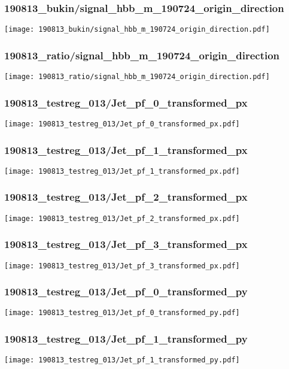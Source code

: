 \begin{frame}
   \frametitle{\small 190813\_bukin/signal\_hbb\_m\_190724\_origin\_direction}
   \centering
   \texttt{[image: 190813\_bukin/signal\_hbb\_m\_190724\_origin\_direction.pdf]}
\end{frame}

\begin{frame}
   \frametitle{\small 190813\_ratio/signal\_hbb\_m\_190724\_origin\_direction}
   \centering
   \texttt{[image: 190813\_ratio/signal\_hbb\_m\_190724\_origin\_direction.pdf]}
\end{frame}

\begin{frame}
   \frametitle{\small 190813\_testreg\_013/Jet\_pf\_0\_transformed\_px}
   \centering
   \texttt{[image: 190813\_testreg\_013/Jet\_pf\_0\_transformed\_px.pdf]}
\end{frame}

\begin{frame}
   \frametitle{\small 190813\_testreg\_013/Jet\_pf\_1\_transformed\_px}
   \centering
   \texttt{[image: 190813\_testreg\_013/Jet\_pf\_1\_transformed\_px.pdf]}
\end{frame}

\begin{frame}
   \frametitle{\small 190813\_testreg\_013/Jet\_pf\_2\_transformed\_px}
   \centering
   \texttt{[image: 190813\_testreg\_013/Jet\_pf\_2\_transformed\_px.pdf]}
\end{frame}

\begin{frame}
   \frametitle{\small 190813\_testreg\_013/Jet\_pf\_3\_transformed\_px}
   \centering
   \texttt{[image: 190813\_testreg\_013/Jet\_pf\_3\_transformed\_px.pdf]}
\end{frame}

\begin{frame}
   \frametitle{\small 190813\_testreg\_013/Jet\_pf\_0\_transformed\_py}
   \centering
   \texttt{[image: 190813\_testreg\_013/Jet\_pf\_0\_transformed\_py.pdf]}
\end{frame}

\begin{frame}
   \frametitle{\small 190813\_testreg\_013/Jet\_pf\_1\_transformed\_py}
   \centering
   \texttt{[image: 190813\_testreg\_013/Jet\_pf\_1\_transformed\_py.pdf]}
\end{frame}

